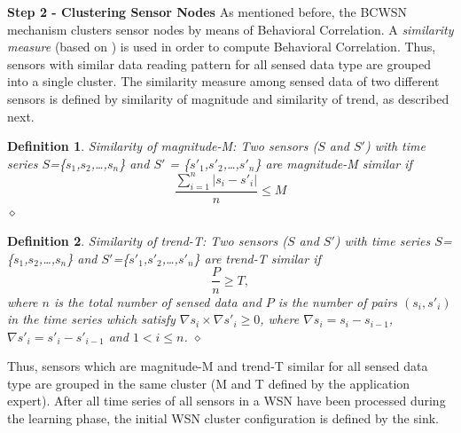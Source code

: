 \documentclass{acm_proc_article-sp}
\newcommand{\dia}{\hspace*{.1cm} \hfill $\diamond$}
\begin{document}
{\bf Step 2 - Clustering Sensor Nodes}
As mentioned before, the BCWSN mechanism clusters sensor nodes by means of
Behavioral Correlation. A \textit{similarity measure} (based on \cite{Liu2007})
is used in order to compute Behavioral Correlation. Thus, sensors with similar
data reading pattern for all sensed data type are grouped into a single cluster.
The similarity measure among sensed data of two different sensors is defined by
similarity of magnitude and similarity of trend, as described next.
\vspace*{-.3cm}

\newtheorem{defini}{Definition}

\begin{defini}
Similarity of magnitude-M: Two sensors ($S$ and $S'$) with time series
$S$=\{$s_{1}$,$s_{2}$,\ldots,$s_{n}$\} and
$S'$ = \{$s'_{1}$,$s'_{2}$,\ldots,$s'_{n}$\} are magnitude-M similar if 
\begin{equation}
\label{equ:magni}
\frac{\sum_{i=1}^{n} |s_{i}-s'_{i}|}{n} \leq M
\end{equation}
\dia
\end{defini}
\vspace*{-.9cm}

\begin{defini}
Similarity of trend-T: Two sensors ($S$ and $S'$) with time series
$S$=\{$s_{1}$,$s_{2}$,\ldots,$s_{n}$\} and
$S'$=\{$s'_{1}$,$s'_{2}$,\ldots,$s'_{n}$\} are trend-T similar if 
\begin{equation}
\label{equ:trend}
\frac{P}{n} \geq T,
\end{equation}
where $n$ is the total number of sensed data and $P$ is the number of pairs
$(s_{i},s'_{i})$ in the time series which satisfy $\nabla s_{i} \times \nabla
s'_{i} \geq 0$, where $\nabla s_{i} = s_{i} - s_{i-1}$, $\nabla
s'_{i} = s'_{i} - s'_{i-1}$ and $1 < i \leq n$.
\dia
\end{defini}
\vspace*{-.5cm}

Thus, sensors which are magnitude-M and trend-T similar for all sensed data type
are grouped in the same cluster (M and T defined by the application expert).
After all time series of all sensors in a WSN have been processed during the
learning phase, the initial WSN cluster configuration is defined by the sink.
\vspace*{-.3cm}
\end{document}

